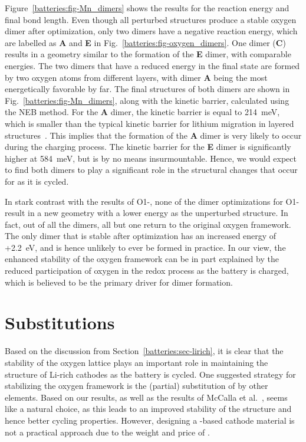 \begin{refsection}
Figure~\ref{batteries:fig-Mn_dimers} shows the results for the reaction energy 
and final bond length. Even though all perturbed structures 
produce a stable oxygen dimer after optimization, only two dimers have a 
negative reaction energy, which are labelled as \textbf{A} and \textbf{E} 
in Fig.~\ref{batteries:fig-oxygen_dimers}. One dimer (\textbf{C}) results in a 
geometry similar to the formation of the \textbf{E} dimer, with comparable 
energies. The two dimers that have a reduced energy in the final state are 
formed by two oxygen atoms from different layers, with dimer \textbf{A} being 
the most energetically favorable by far. The final structures of both 
dimers are shown in Fig.~\ref{batteries:fig-Mn_dimers}, along with the kinetic barrier, 
calculated using the NEB method. For the \textbf{A} dimer, the kinetic barrier 
is equal to 214~\si{\milli\electronvolt}, which is smaller than the typical 
kinetic barrier for lithium migration in layered 
structures~\cite{VanDerVen2013}. This implies that the formation of the 
\textbf{A} dimer is very likely to occur during the charging process. The 
kinetic barrier for the \textbf{E} dimer is significantly higher at 
584~\si{\milli\electronvolt}, but is by no means insurmountable. Hence, we 
would expect to find both dimers to play a significant role in the structural 
changes that occur for  as it is cycled. 
 
In stark contrast with the results of O1-, none of the dimer 
optimizations for O1- result in a new geometry with a lower 
energy as the unperturbed structure. In fact, out of all the dimers, all but 
one return to the original oxygen framework. The only dimer that is stable 
after optimization has an increased energy of +2.2~\si{\electronvolt}, and is 
hence unlikely to ever be formed in practice. In our view, the enhanced 
stability of the oxygen framework can be in part explained by the reduced 
participation of oxygen in the redox process as the battery is charged, which 
is believed to be the primary driver for dimer formation. 
 
\section{Substitutions} \label{batteries:sec-substitutions} 
 
Based on the discussion from Section~\ref{batteries:sec-lirich}, it is clear 
that the stability of the oxygen lattice plays an important role in 
maintaining the structure of Li-rich cathodes as the battery is cycled. One 
suggested strategy for stabilizing the oxygen framework is the (partial) 
substitution of  by other elements. Based on our results, as well 
as the results of McCalla et al.~\cite{McCalla2015},  seems like a 
natural choice, as this leads to an improved stability of the structure and 
hence better cycling properties. However, designing a -based cathode 
material is not a practical approach due to the weight and price of . 
 

\end{refsection}
